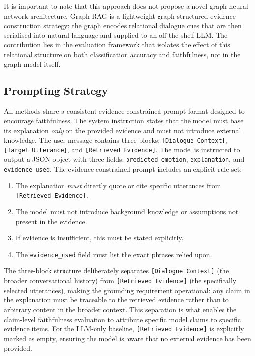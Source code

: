 \documentclass[runningheads]{llncs}
\begin{document}
It is important to note that this approach does not propose a novel
graph neural network architecture. Graph RAG is a lightweight
graph-structured evidence construction strategy: the graph encodes
relational dialogue cues that are then serialised into natural
language and supplied to an off-the-shelf LLM. The contribution
lies in the evaluation framework that isolates the effect of this
relational structure on both classification accuracy and
faithfulness, not in the graph model itself.

\subsection{Prompting Strategy}
\label{sec:prompting}

All methods share a consistent evidence-constrained prompt format
designed to encourage faithfulness. The system instruction states that
the model must base its explanation \emph{only} on the provided
evidence and must not introduce external knowledge. The user message
contains three blocks: \texttt{[Dialogue Context]}, \texttt{[Target
Utterance]}, and \texttt{[Retrieved Evidence]}. The model is instructed
to output a JSON object with three fields:
\texttt{predicted\_emotion}, \texttt{explanation}, and
\texttt{evidence\_used}. The evidence-constrained prompt includes an
explicit rule set:

\begin{enumerate}
    \item The explanation \emph{must} directly quote or cite specific
    utterances from \texttt{[Retrieved Evidence]}.
    \item The model must not introduce background knowledge or
    assumptions not present in the evidence.
    \item If evidence is insufficient, this must be stated explicitly.
    \item The \texttt{evidence\_used} field must list the exact phrases
    relied upon.
\end{enumerate}

The three-block structure deliberately separates \texttt{[Dialogue
Context]} (the broader conversational history) from \texttt{[Retrieved
Evidence]} (the specifically selected utterances), making the grounding
requirement operational: any claim in the explanation must be traceable
to the retrieved evidence rather than to arbitrary content in the broader
context. This separation is what enables the claim-level faithfulness
evaluation to attribute specific model claims to specific evidence items.
For the LLM-only baseline, \texttt{[Retrieved Evidence]} is explicitly
marked as empty, ensuring the model is aware that no external evidence
has been provided.
\end{document}
